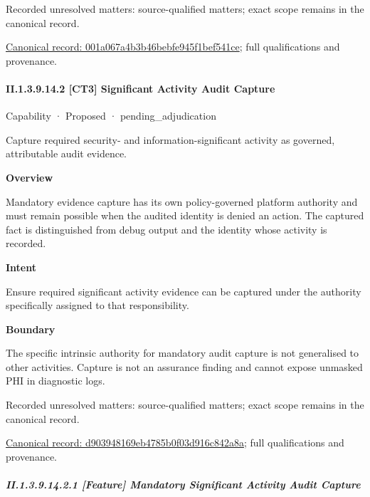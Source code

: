 {\small Recorded unresolved matters: source-qualified matters; exact scope remains in the canonical record.}\par
{\footnotesize \href{../../../../../../../continuum/strategy/capability/feature/001a067a4b3b46bebfe945f1bef541ce.md}{Canonical record: 001a067a4b3b46bebfe945f1bef541ce}; full qualifications and provenance.}\par
\paragraph*{II.1.3.9.14.2 [CT3] Significant Activity Audit Capture}
\label{navigation:II.1.3.9.14.2}

\label{element:d903948169eb4785b0f03d916c842a8a}
{\small Capability · Proposed · pending\_adjudication}\par

Capture required security- and information-significant activity as governed, attributable audit evidence.



\textbf{Overview}



Mandatory evidence capture has its own policy-governed platform authority and must remain possible when the audited identity is denied an action. The captured fact is distinguished from debug output and the identity whose activity is recorded.



\textbf{Intent}



Ensure required significant activity evidence can be captured under the authority specifically assigned to that responsibility.



\textbf{Boundary}



The specific intrinsic authority for mandatory audit capture is not generalised to other activities. Capture is not an assurance finding and cannot expose unmasked PHI in diagnostic logs.


{\small Recorded unresolved matters: source-qualified matters; exact scope remains in the canonical record.}\par
{\footnotesize \href{../../../../../../../continuum/strategy/capability/d903948169eb4785b0f03d916c842a8a.md}{Canonical record: d903948169eb4785b0f03d916c842a8a}; full qualifications and provenance.}\par
\subparagraph*{II.1.3.9.14.2.1 [Feature] Mandatory Significant Activity Audit Capture}
\label{navigation:II.1.3.9.14.2.1}

